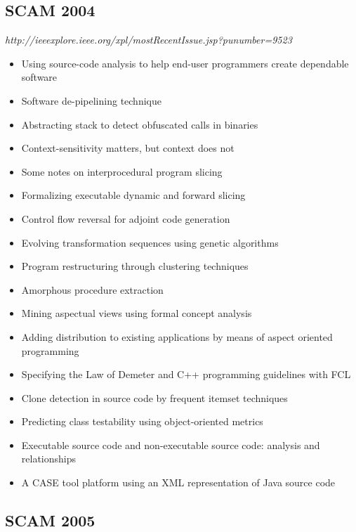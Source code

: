 \subsection{SCAM 2004}

{\small \em http://ieeexplore.ieee.org/xpl/mostRecentIssue.jsp?punumber=9523}

{\small
\begin{itemize}[itemsep=-1ex]
  \item Using source-code analysis to help end-user programmers create dependable software
  \item Software de-pipelining technique
  \item Abstracting stack to detect obfuscated calls in binaries
  \item Context-sensitivity matters, but context does not
  \item Some notes on interprocedural program slicing
  \item Formalizing executable dynamic and forward slicing
  \item Control flow reversal for adjoint code generation
  \item Evolving transformation sequences using genetic algorithms
  \item Program restructuring through clustering techniques
  \item Amorphous procedure extraction
  \item Mining aspectual views using formal concept analysis
  \item Adding distribution to existing applications by means of aspect oriented programming {\color{blue} \checkmark}{\color{red} \texttimes}
  \item Specifying the Law of Demeter and C++ programming guidelines with FCL {\color{blue} \checkmark}{\color{red} \texttimes}
  \item Clone detection in source code by frequent itemset techniques
  \item Predicting class testability using object-oriented metrics
  \item Executable source code and non-executable source code: analysis and relationships
  \item A CASE tool platform using an XML representation of Java source code {\color{blue} \checkmark}{\color{red} \texttimes}
\end{itemize}
}

\subsection{SCAM 2005}

